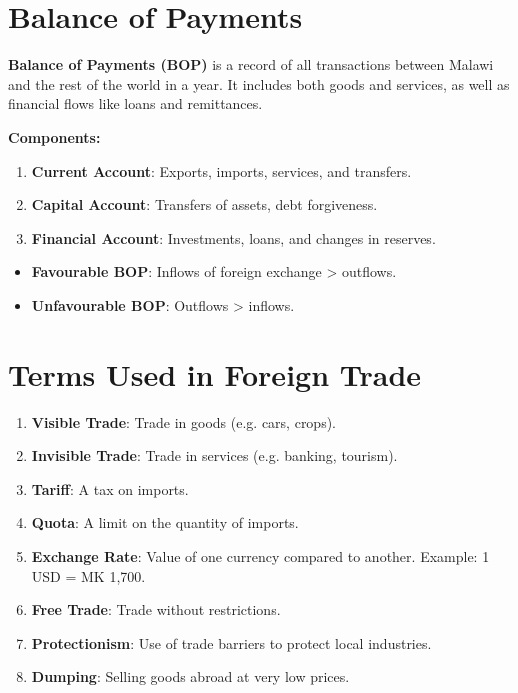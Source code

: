 \documentclass[12pt,a4paper, openany]{book}
\begin{document}
\section{Balance of Payments}
\textbf{Balance of Payments (BOP)} is a record of all transactions between Malawi and the rest of the world in a year.
It includes both goods and services, as well as financial flows like loans and remittances.

\textbf{Components:}
\begin{enumerate}
	\item \textbf{Current Account}: Exports, imports, services, and transfers.
	\item \textbf{Capital Account}: Transfers of assets, debt forgiveness.
	\item \textbf{Financial Account}: Investments, loans, and changes in reserves.
\end{enumerate}

\begin{itemize}
	\item \textbf{Favourable BOP}: Inflows of foreign exchange > outflows.
	\item \textbf{Unfavourable BOP}: Outflows > inflows.
\end{itemize}

\section{Terms Used in Foreign Trade}
\begin{enumerate}
	\item \textbf{Visible Trade}: Trade in goods (e.g. cars, crops).
	\item \textbf{Invisible Trade}: Trade in services (e.g. banking, tourism).
	\item \textbf{Tariff}: A tax on imports.
	\item \textbf{Quota}: A limit on the quantity of imports.
	\item \textbf{Exchange Rate}: Value of one currency compared to another.
	      Example: 1 USD = MK 1,700.
	\item \textbf{Free Trade}: Trade without restrictions.
	\item \textbf{Protectionism}: Use of trade barriers to protect local industries.
	\item \textbf{Dumping}: Selling goods abroad at very low prices.
\end{enumerate}
\end{document}
